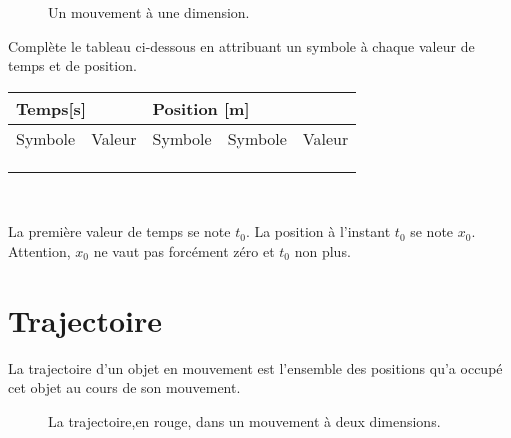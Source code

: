\begin{figure}[h!]
    \centering
    \resizebox{.7\linewidth}{!}{}
    \caption{Un mouvement à une dimension.}
    \label{position_referentiel}
\end{figure}

Complète le tableau ci-dessous en attribuant un symbole à chaque valeur de temps et de position.\\
\renewcommand{\arraystretch}{1.5}
\begin{tabularx}{\linewidth}{|X|X|X|X|X|}
    \hline
    \multicolumn{2}{|l|}{Temps[s]} & \multicolumn{3}{l|}{Position [m]}                              \\
    \hline
    Symbole                        & Valeur                            & Symbole & Symbole & Valeur \\
    \hline
                                   &                                   &         &         &        \\
    \hline
                                   &                                   &         &         &        \\
    \hline
                                   &                                   &         &         &        \\
    \hline
\end{tabularx}
\renewcommand{\arraystretch}{1}\\



\begin{encadre}
    La première valeur de temps se note \(t_0\). La position à l'instant \(t_0\) se note \(x_0\). Attention, \(x_0\) ne vaut pas forcément zéro et \(t_0\) non plus.
\end{encadre}

\newpage

\section{Trajectoire}
La trajectoire d'un objet en mouvement est l'ensemble des positions qu'a occupé cet objet au cours de son mouvement.

\begin{figure}[h!]
    \centering
    \resizebox{.6\linewidth}{!}{}
    \caption{La trajectoire,en rouge, dans un mouvement à deux dimensions.}
    \label{position_referentiel}
\end{figure}

